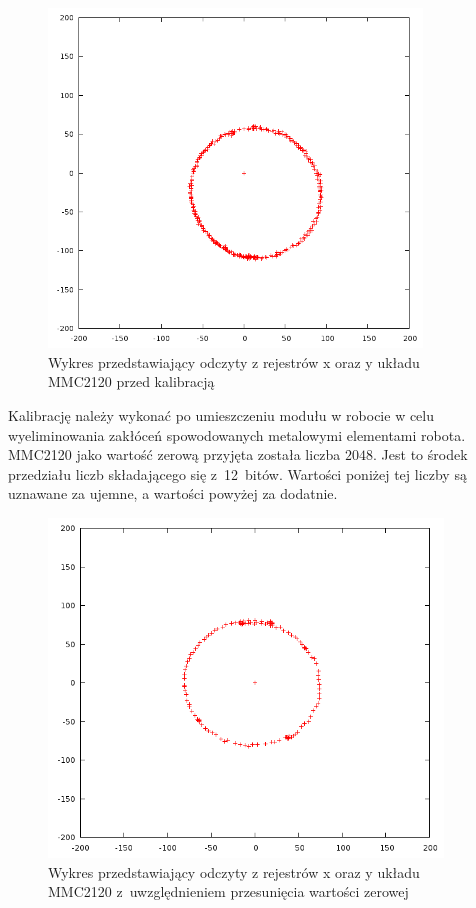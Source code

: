 \newpage
\begin{figure}[!ht]
 \centering
 \includegraphics[height=90mm]{../images/ch04/mmc2120-without-callibration.png}
 \caption{Wykres przedstawiający odczyty z rejestrów x oraz y układu MMC2120 przed kalibracją}
 \label{fig:MMC2120NotCalibrated}
\end{figure}

Kalibrację należy wykonać po umieszczeniu modułu w robocie w celu wyeliminowania
zakłóceń spowodowanych metalowymi elementami robota. MMC2120 jako wartość zerową
przyjęta została liczba $2048$. Jest to środek przedziału liczb składającego się
z~12~bitów. Wartości poniżej tej liczby są uznawane za ujemne, a wartości powyżej za
dodatnie.

\begin{figure}[!ht]
 \centering
 \includegraphics[height=90mm]{../images/ch04/mmc2120-with-callibration.png}
 \caption{Wykres przedstawiający odczyty z rejestrów x oraz y układu MMC2120 z~uwzględnieniem przesunięcia wartości zerowej}
 \label{fig:MMC2120Calibrated}
\end{figure}

